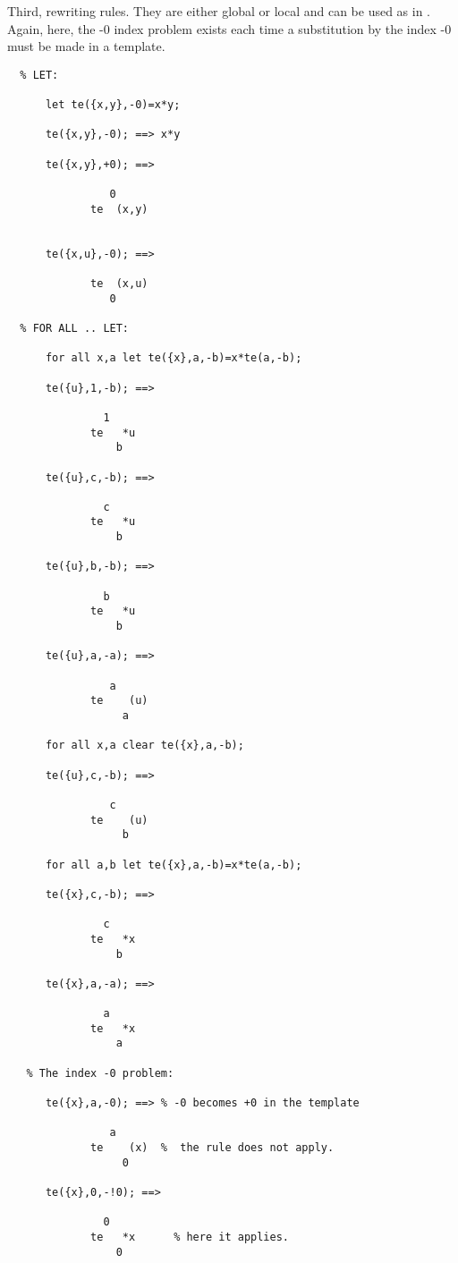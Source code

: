 Third, rewriting rules. They are either global or local and 
can be used as in \REDUCE. 
Again, here,  the -0 index problem exists each time a substitution 
by the index -0 must be made in a template. 
\begin{verbatim}
  % LET:

      let te({x,y},-0)=x*y;

      te({x,y},-0); ==> x*y

      te({x,y},+0); ==> 

                0
             te  (x,y)


      te({x,u},-0); ==>

             te  (x,u)
                0

  % FOR ALL .. LET:

      for all x,a let te({x},a,-b)=x*te(a,-b);

      te({u},1,-b); ==>

               1
             te   *u
                 b

      te({u},c,-b); ==>

               c
             te   *u
                 b

      te({u},b,-b); ==>

               b
             te   *u
                 b

      te({u},a,-a); ==>

                a
             te    (u)
                  a

      for all x,a clear te({x},a,-b);

      te({u},c,-b); ==>

                c
             te    (u)
                  b

      for all a,b let te({x},a,-b)=x*te(a,-b);

      te({x},c,-b); ==>

               c
             te   *x
                 b

      te({x},a,-a); ==>

               a
             te   *x
                 a

   % The index -0 problem:

      te({x},a,-0); ==> % -0 becomes +0 in the template

                a
             te    (x)  %  the rule does not apply. 
                  0

      te({x},0,-!0); ==>

               0
             te   *x      % here it applies.  
                 0
\end{verbatim}
